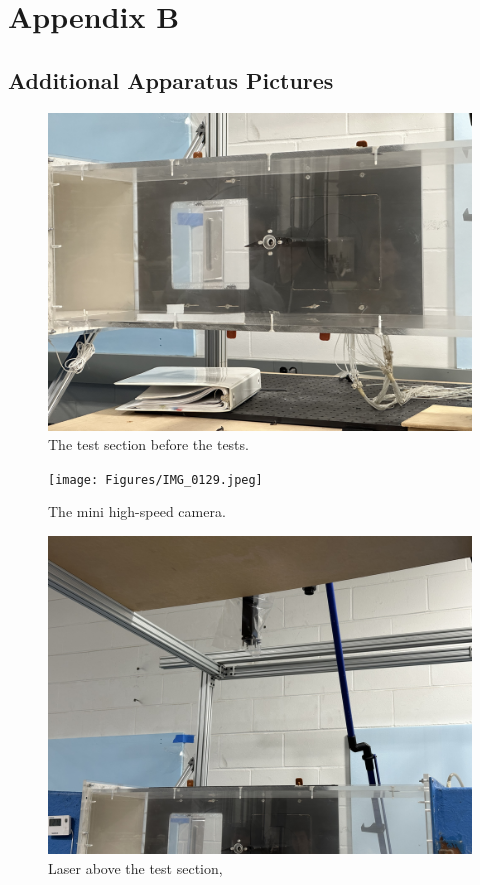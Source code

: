\chapter{Appendix B}

\section{Additional Apparatus Pictures} \label{sec:additional_apparatus}

\begin{figure}[htpb]
    \centering
    \includegraphics[width=0.75\linewidth]{Figures/IMG_0127.jpeg}
    \caption{The test section before the tests.}
    \label{fig:Test_Section}
\end{figure}

\begin{figure}[htpb]
    \centering
    \texttt{[image: Figures/IMG\_0129.jpeg]}
    \caption{The mini high-speed camera.}
    \label{fig:High_Speed_Camera}
\end{figure}

\begin{figure}[htpb]
    \centering
    \includegraphics[width=0.75\linewidth]{Figures/IMG_0130.jpeg}
    \caption{Laser above the test section,}
    \label{fig:Laser}
\end{figure}

